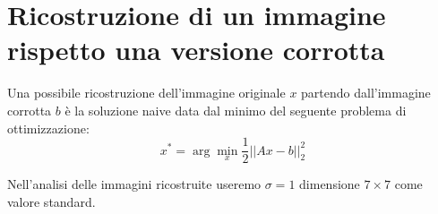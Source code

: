 \section{Ricostruzione di un immagine rispetto una versione corrotta}
Una possibile ricostruzione dell'immagine originale $x$ partendo dall'immagine corrotta $b$ è la soluzione naive data dal minimo del seguente problema di ottimizzazione:
\[x^* = \arg\min_x \frac{1}{2} ||Ax - b||_2^2\]

Nell'analisi delle immagini ricostruite useremo $\sigma=1$ dimensione $7\times 7$ come valore standard.
